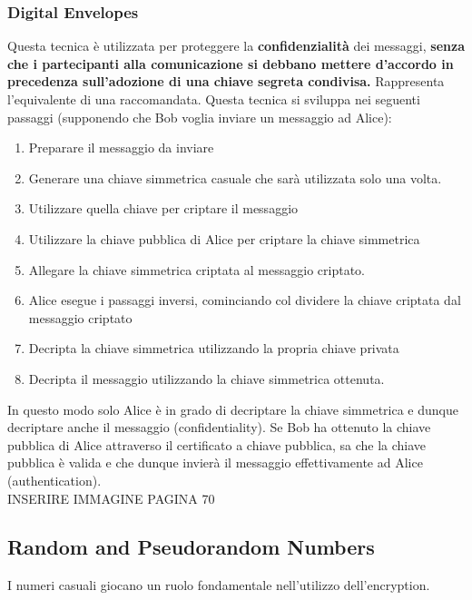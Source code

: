 \documentclass[12pt]{article}
\begin{document}
		\subsubsection{Digital Envelopes}
			Questa tecnica è utilizzata per proteggere la \textbf{confidenzialità} dei messaggi, \textbf{senza che i partecipanti alla comunicazione si debbano mettere d'accordo in precedenza sull'adozione di una chiave segreta condivisa.} Rappresenta l'equivalente di una raccomandata. Questa tecnica si sviluppa nei seguenti passaggi (supponendo che Bob voglia inviare un messaggio ad Alice):
			\begin{enumerate}
				\item Preparare il messaggio da inviare
				\item Generare una chiave simmetrica casuale che sarà utilizzata solo una volta.
				\item Utilizzare quella chiave per criptare il messaggio
				\item Utilizzare la chiave pubblica di Alice per criptare la chiave simmetrica 
				\item Allegare la chiave simmetrica criptata al messaggio criptato.
				\item Alice esegue i passaggi inversi, cominciando col dividere la chiave criptata dal messaggio criptato
				\item Decripta la chiave simmetrica utilizzando la propria chiave privata
				\item Decripta il messaggio utilizzando la chiave simmetrica ottenuta.
			\end{enumerate} 
			In questo modo solo Alice è in grado di decriptare la chiave simmetrica e dunque decriptare anche il messaggio (confidentiality). Se Bob ha ottenuto la chiave pubblica di Alice attraverso il certificato a chiave pubblica, sa che la chiave pubblica è valida e che dunque invierà il messaggio effettivamente ad Alice (authentication).\\
			INSERIRE IMMAGINE PAGINA 70\\
	\subsection{Random and Pseudorandom Numbers}
		I numeri casuali giocano un ruolo fondamentale nell'utilizzo dell'encryption.
			
			
		
		
			 
			 
			 	
	
		
\end{document}
